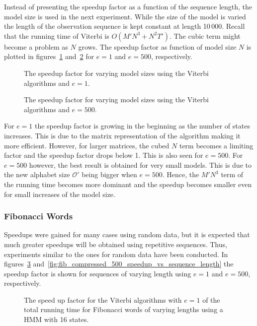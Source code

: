 Instead of presenting the speedup factor as a function of the sequence length,
the model size is used in the next experiment. While the size of the model
is varied the length of the observation sequence is kept constant at length
10\,000. Recall that the running time of Viterbi is $O(M' N^3 + N^2 T')$. The
cubic term might become a problem as $N$ grows. The speedup factor as function
of model size $N$ is plotted in figures~\ref{fig:speedup_vs_N}
and~\ref{fig:speedup_vs_N2} for $e = 1$ and $e = 500$,
respectively.

\begin{figure}
  \centering
  
  \caption{The speedup factor for varying model sizes using the Viterbi
    algorithms and $e = 1$.}
  \label{fig:speedup_vs_N}
\end{figure}

\begin{figure}
  \centering
  
  \caption{The speedup factor for varying model sizes using the Viterbi
    algorithms and $e=500$.}
  \label{fig:speedup_vs_N2}
\end{figure}

For $e = 1$ the speedup factor is growing in the beginning as the number of
states increases. This is due to the matrix representation of the algorithm
making it more efficient. However, for larger matrices, the cubed $N$ term
becomes a limiting factor and the speedup factor drops below 1. This is also
seen for $e = 500$. For $e = 500$ however, the best result is obtained for very
small models. This is due to the new alphabet size $\mathcal{O'}$ being
bigger when $e = 500$. Hence, the $M' N^3$ term of the running time becomes
more dominant and the speedup becomes smaller even for small increases of the
model size.

\subsubsection{Fibonacci Words}

Speedups were gained for many cases using random data, but it is
expected that much greater speedups will be obtained using repetitive
sequences. Thus, experiments similar to the ones for random data have been
conducted. In figures~\ref{fig:fib_compressed_1_speedup_vs_sequence_length}
and~\ref{fig:fib_compressed_500_speedup_vs_sequence_length} the speedup factor
is shown for sequences of varying length using $e = 1$ and $e = 500$, respectively.

\begin{figure}
  \centering
  
  \caption{The speed up factor for the Viterbi algorithms with $e = 1$ of the total
    running time for Fibonacci words of varying
    lengths using a HMM with 16 states.}
  \label{fig:fib_compressed_1_speedup_vs_sequence_length}
\end{figure}

